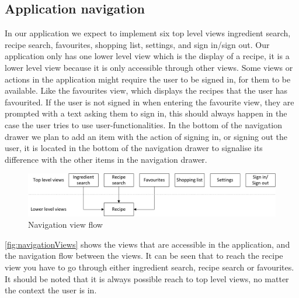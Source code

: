 \subsection{Application navigation}
In our application we expect to implement six top level views ingredient search, recipe search, favourites, shopping list, settings, and sign in/sign out. 
Our application only has one lower level view which is the display of a recipe, it is a lower level view because it is only accessible through other views.
Some views or actions in the application might require the user to be signed in, for them to be available. 
Like the favourites view, which displays the recipes that the user has favourited.
If the user is not signed in when entering the favourite view, they are prompted with a text asking them to sign in, this should always happen in the case the user tries to use user-functionalities. 
In the bottom of the navigation drawer we plan to add an item with the action of signing in, or signing out the user, it is located in the bottom of the navigation drawer to signalise its difference with the other items in the navigation drawer.
\begin{figure}[H]
\centering
\includegraphics[width=1.0\linewidth]{img/navigation.pdf}
\caption{Navigation view flow}
\label{fig:navigationViews}
\end{figure}
\autoref{fig:navigationViews} shows the views that are accessible in the application, and the navigation flow between the views. 
It can be seen that to reach the recipe view you have to go through either ingredient search, recipe search or favourites. It should be noted that it is always possible reach to top level views, no matter the context the user is in.
